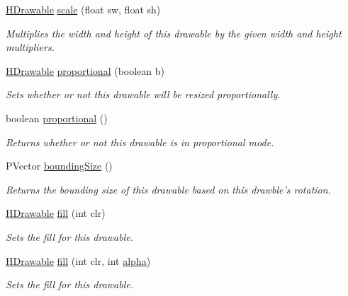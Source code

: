 \begin{DoxyCompactItemize}
\hyperlink{classhype_1_1drawable_1_1_h_drawable}{H\-Drawable} \hyperlink{classhype_1_1drawable_1_1_h_drawable_aa40926c8864935d6d5b7ea16f3485f9f}{scale} (float sw, float sh)
\begin{DoxyCompactList}\small\item\em Multiplies the width and height of this drawable by the given width and height multipliers. \end{DoxyCompactList}\item 
\hyperlink{classhype_1_1drawable_1_1_h_drawable}{H\-Drawable} \hyperlink{classhype_1_1drawable_1_1_h_drawable_add4d7ddda7e479ab0c295ed5798ff313}{proportional} (boolean b)
\begin{DoxyCompactList}\small\item\em Sets whether or not this drawable will be resized proportionally. \end{DoxyCompactList}\item 
boolean \hyperlink{classhype_1_1drawable_1_1_h_drawable_a0b4162d5fbb7f045f84143beeafe4fb1}{proportional} ()
\begin{DoxyCompactList}\small\item\em Returns whether or not this drawable is in proportional mode. \end{DoxyCompactList}\item 
P\-Vector \hyperlink{classhype_1_1drawable_1_1_h_drawable_a70e91337f0ceafe27f5119e12063cc8e}{bounding\-Size} ()
\begin{DoxyCompactList}\small\item\em Returns the bounding size of this drawable based on this drawble's rotation. \end{DoxyCompactList}\item 
\hyperlink{classhype_1_1drawable_1_1_h_drawable}{H\-Drawable} \hyperlink{classhype_1_1drawable_1_1_h_drawable_aa0d3bfb3c918f18674b49bb6af4ec46b}{fill} (int clr)
\begin{DoxyCompactList}\small\item\em Sets the fill for this drawable. \end{DoxyCompactList}\item 
\hyperlink{classhype_1_1drawable_1_1_h_drawable}{H\-Drawable} \hyperlink{classhype_1_1drawable_1_1_h_drawable_a2448e52613f3bc717d251ad7320cf383}{fill} (int clr, int \hyperlink{classhype_1_1drawable_1_1_h_drawable_a03c7275f5caab5cc9034b18d4c2f1305}{alpha})
\begin{DoxyCompactList}\small\item\em Sets the fill for this drawable. \end{DoxyCompactList}\item 

\end{DoxyCompactItemize}
